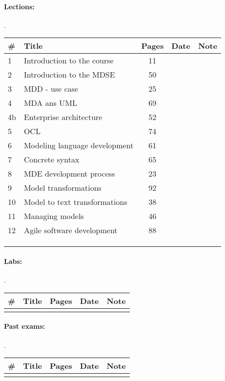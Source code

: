\documentclass[a4paper,12pt]{article} %
\begin{document}
\paragraph{Lections:} .\\
\begin{tabularx}{\textwidth}{|l|X|c|l|c|}
	\hline
	\# & Title & Pages & Date & Note \\
	\hline
	1 & Introduction to the course & 11 &  &  \\
	\hline
	2 & Introduction to the MDSE & 50 &  &  \\
	\hline
	3 & MDD - use case & 25 &  &  \\
	\hline
	4 & MDA ans UML & 69 &  &  \\
	\hline
	4b & Enterprise architecture & 52 &  &  \\
	\hline
	5 & OCL & 74 &  &  \\
	\hline
	6 & Modeling language development & 61 &  &  \\
	\hline
	7 & Concrete syntax & 65 &  &  \\
	\hline
	8 & MDE development process & 23 &  &  \\
	\hline
	9 & Model transformations & 92 &  &  \\
	\hline
	10 & Model to text transformations & 38 &  &  \\
	\hline
	11 & Managing models & 46 &  &  \\
	\hline
	12 & Agile software development & 88 &  &  \\
	\hline
	&  &  &  &  \\
	\hline
	&  &  &  &  \\
	\hline
	&  &  &  &  \\
	\hline
\end{tabularx}

\paragraph{Labs:}.\\
\begin{tabularx}{\textwidth}{|l|X|c|l|c|}
	\hline
	\# & Title & Pages & Date & Note \\
	\hline
	&  &  &  &  \\
	\hline
\end{tabularx}

\paragraph{Past exams:}.\\
\begin{tabularx}{\textwidth}{|l|X|c|l|c|}
	\hline
	\# & Title & Pages & Date & Note \\
	\hline
	&  &  &  &  \\
	\hline
\end{tabularx}
\end{document}

